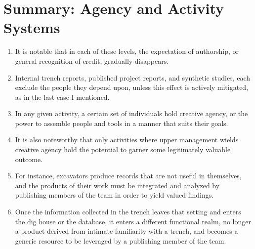 \documentclass[12pt]{article}
\begin{document}
\section{Summary: Agency and Activity Systems}
\begin{enumerate}
  \item It is notable that in each of these levels, the expectation of authorship, or general recognition of credit, gradually disappears.
  \item Internal trench reports, published project reports, and synthetic studies, each exclude the people they depend upon, unless this effect is actively mitigated, as in the last case I mentioned.
  \item In any given activity, a certain set of individuals hold creative agency, or the power to assemble people and tools in a manner that suits their goals.
  \item It is also noteworthy that only activities where upper management wields creative agency hold the potential to garner some legitimately valuable outcome.
  \item For instance, excavators produce records that are not useful in themselves, and the products of their work must be integrated and analyzed by publishing members of the team in order to yield valued findings.
  \item Once the information collected in the trench leaves that setting and enters the dig house or the database, it enters a different functional realm, no longer a product derived from intimate familiarity with a trench, and becomes a generic resource to be leveraged by a publishing member of the team.
\end{enumerate}
\end{document}
